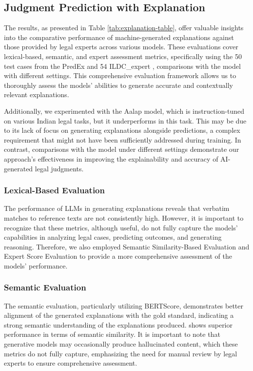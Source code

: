 \subsection{Judgment Prediction with Explanation}
The results, as presented in Table \ref{tab:explanation-table}, offer valuable insights into the comparative performance of machine-generated explanations against those provided by legal experts across various models. These evaluations cover lexical-based, semantic, and expert assessment metrics, specifically using the 50 test cases from the PredEx \cite{nigam2024legaljudgmentreimaginedpredex} and 54 ILDC\_expert \cite{malik-etal-2021-ildc}, comparisons with the \texttt{\namel} model with different settings. This comprehensive evaluation framework allows us to thoroughly assess the models' abilities to generate accurate and contextually relevant explanations.

Additionally, we experimented with the Aalap \cite{tiwari2024aalap} model, which is instruction-tuned on various Indian legal tasks, but it underperforms in this task. This may be due to its lack of focus on generating explanations alongside predictions, a complex requirement that might not have been sufficiently addressed during training. In contrast, comparisons with the \texttt{\namel} model under different settings demonstrate our approach's effectiveness in improving the explainability and accuracy of AI-generated legal judgments.

\subsubsection{Lexical-Based Evaluation}
The performance of LLMs in generating explanations reveals that verbatim matches to reference texts are not consistently high. However, it is important to recognize that these metrics, although useful, do not fully capture the models' capabilities in analyzing legal cases, predicting outcomes, and generating reasoning. Therefore, we also employed Semantic Similarity-Based Evaluation and Expert Score Evaluation to provide a more comprehensive assessment of the models' performance.

\subsubsection{Semantic Evaluation}
The semantic evaluation, particularly utilizing BERTScore, demonstrates better alignment of the generated explanations with the gold standard, indicating a strong semantic understanding of the explanations produced. \texttt{\namel} shows superior performance in terms of semantic similarity. It is important to note that generative models may occasionally produce hallucinated content, which these metrics do not fully capture, emphasizing the need for manual review by legal experts to ensure comprehensive assessment.


